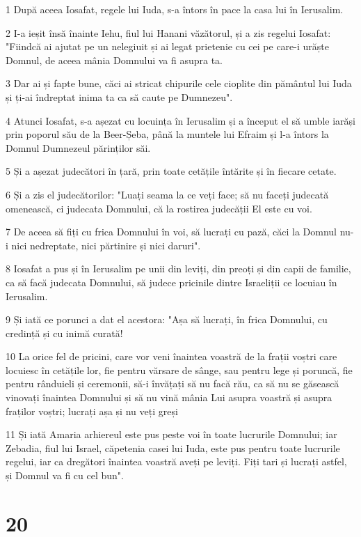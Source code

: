 \par 1 După aceea Iosafat, regele lui Iuda, s-a întors în pace la casa lui în Ierusalim.
\par 2 I-a ieșit însă înainte Iehu, fiul lui Hanani văzătorul, și a zis regelui Iosafat: "Fiindcă ai ajutat pe un nelegiuit și ai legat prietenie cu cei pe care-i urăște Domnul, de aceea mânia Domnului va fi asupra ta.
\par 3 Dar ai și fapte bune, căci ai stricat chipurile cele cioplite din pământul lui Iuda și ți-ai îndreptat inima ta ca să caute pe Dumnezeu".
\par 4 Atunci Iosafat, s-a așezat cu locuința în Ierusalim și a început el să umble iarăși prin poporul său de la Beer-Șeba, până la muntele lui Efraim și l-a întors la Domnul Dumnezeul părinților săi.
\par 5 Și a așezat judecători în țară, prin toate cetățile întărite și în fiecare cetate.
\par 6 Și a zis el judecătorilor: "Luați seama la ce veți face; să nu faceți judecată omenească, ci judecata Domnului, că la rostirea judecății El este cu voi.
\par 7 De aceea să fiți cu frica Domnului în voi, să lucrați cu pază, căci la Domnul nu-i nici nedreptate, nici părtinire și nici daruri".
\par 8 Iosafat a pus și în Ierusalim pe unii din leviți, din preoți și din capii de familie, ca să facă judecata Domnului, să judece pricinile dintre Israeliții ce locuiau în Ierusalim.
\par 9 Și iată ce porunci a dat el acestora: "Așa să lucrați, în frica Domnului, cu credință și cu inimă curată!
\par 10 La orice fel de pricini, care vor veni înaintea voastră de la frații voștri care locuiesc în cetățile lor, fie pentru vărsare de sânge, sau pentru lege și poruncă, fie pentru rânduieli și ceremonii, să-i învățați să nu facă rău, ca să nu se găsească vinovați înaintea Domnului și să nu vină mânia Lui asupra voastră și asupra fraților voștri; lucrați așa și nu veți greși
\par 11 Și iată Amaria arhiereul este pus peste voi în toate lucrurile Domnului; iar Zebadia, fiul lui Israel, căpetenia casei lui Iuda, este pus pentru toate lucrurile regelui, iar ca dregători înaintea voastră aveți pe leviți. Fiți tari și lucrați astfel, și Domnul va fi cu cel bun".

\chapter{20}

